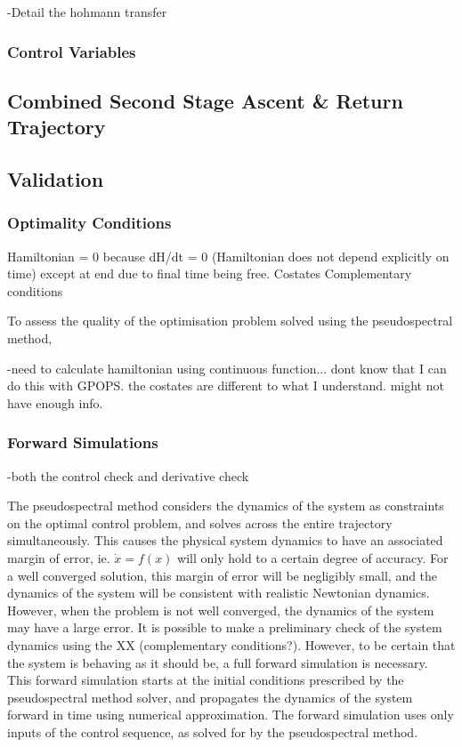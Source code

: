 -Detail the hohmann transfer

\subsubsection{Control Variables}

\subsection{Combined Second Stage Ascent \& Return  Trajectory}

\subsection{Validation}
\subsubsection{Optimality Conditions}
Hamiltonian = 0 because dH/dt = 0 (Hamiltonian does not depend explicitly on time) except at end due to final time being free.
Costates
Complementary conditions

To assess the quality of the optimisation problem solved using the pseudospectral method, 

-need to calculate hamiltonian using continuous function... dont know that I can do this with GPOPS. the costates are different to what I understand. might not have enough info. 

\subsubsection{Forward Simulations}
-both the control check and derivative check

The pseudospectral method considers the dynamics of the system as constraints on the optimal control problem, and solves across the entire trajectory simultaneously. This causes the physical system dynamics to have an associated margin of error, ie. $\dot{x} = f(x)$ will only hold to a certain degree of accuracy. For a well converged solution, this margin of error will be negligibly small, and the dynamics of the system will be consistent with realistic Newtonian dynamics. However, when the problem is not well converged, the dynamics of the system may have a large error. It is possible to make a preliminary check of the system dynamics using the XX (complementary conditions?). However, to be certain that the system is behaving as it should be, a full forward simulation is necessary. This forward simulation starts at the initial conditions prescribed by the pseudospectral method solver, and propagates the dynamics of the system forward in time using numerical approximation. The forward simulation uses only inputs of the control sequence, as solved for by the pseudospectral method. 
